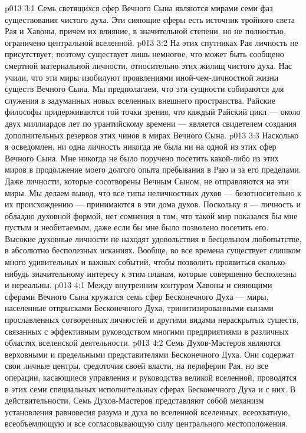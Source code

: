 \vs p013 3:1 Семь светящихся сфер Вечного Сына являются мирами семи фаз существования чистого духа. Эти сияющие сферы есть источник тройного света Рая и Хавоны, причем их влияние, в значительной степени, но не полностью, ограничено центральной вселенной.
\vs p013 3:2 На этих спутниках Рая личность не присутствует; поэтому существует лишь немногое, что может быть сообщено смертной материальной личности, относительно этих жилищ чистого духа. Нас учили, что эти миры изобилуют проявлениями иной\hyp{}чем\hyp{}личностной жизни существ Вечного Сына. Мы предполагаем, что эти сущности собираются для служения в задуманных новых вселенных внешнего пространства. Райские философы придерживаются той точки зрения, что каждый Райский цикл --- около двух миллиардов лет по урантийскому времени --- является свидетелем создания дополнительных резервов этих чинов в мирах Вечного Сына.
\vs p013 3:3 \pc Насколько я осведомлен, ни одна личность никогда не была ни на одной из этих сфер Вечного Сына. Мне никогда не было поручено посетить какой\hyp{}либо из этих миров в продолжение моего долгого опыта пребывания в Раю и за его пределами. Даже личности, которые сосотворены Вечным Сыном, не отправляются на эти миры. Мы делаем вывод, что все типы неличностных духов --- безотносительно к их происхождению --- принимаются в эти дома духов. Поскольку я --- личность и обладаю духовной формой, нет сомнения в том, что такой мир показался бы мне пустым и необитаемым, даже если бы мне было позволено посетить его. Высокие духовные личности не находят удовольствия в бесцельном любопытстве, в абсолютно бесполезных исканиях. Вообще, во все времена существует слишком много удивительных и важных событий, чтобы позволить проявиться сколько\hyp{}нибудь значительному интересу к этим планам, которые совершенно бесполезны и нереальны.
\vs p013 4:1 Между внутренним контуром Хавоны и сияющими сферами Вечного Сына кружатся семь сфер Бесконечного Духа --- миры, населенные отпрысками Бесконечного Духа, тринитизированными сынами прославленных сотворенных личностей и другими видами нераскрытых существ, связанных с эффективным руководством многими предприятиями в различных областях вселенской деятельности.
\vs p013 4:2 Семь Духов\hyp{}Мастеров являются верховными и предельными представителями Бесконечного Духа. Они содержат свои личные центры, средоточия своей власти, на периферии Рая, но все операции, касающиеся управления и руководства великой вселенной, проводятся в этих семи специальных исполнительных сферах Бесконечного Духа и с них. В действительности, Семь Духов\hyp{}Мастеров представляют собой механизм установления равновесия разума и духа во вселенной вселенных, всеохватную, всеобъемлющую и все согласовывающую силу центрального местоположения.
